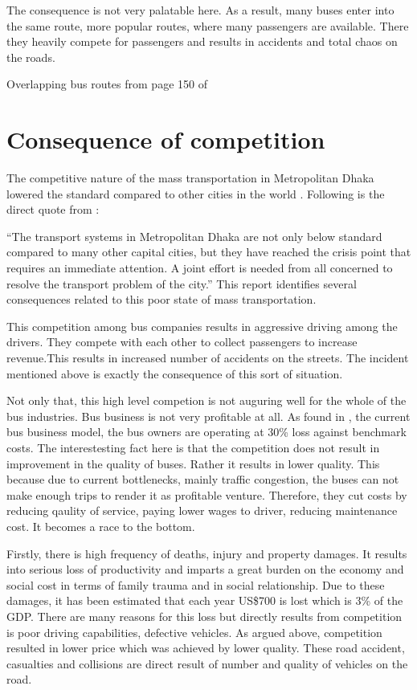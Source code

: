 \documentclass[
  11pt,
]{article}
\begin{document}
The consequence is not very palatable here. As a result, many buses
enter into the same route, more popular routes, where many passengers
are available. There they heavily compete for passengers and results in
accidents and total chaos on the roads.

Overlapping bus routes from page 150 of \textcite{dtca_rstp_2015}

\hypertarget{consequence-of-competition}{%
\section{Consequence of competition}\label{consequence-of-competition}}

The competitive nature of the mass transportation in Metropolitan Dhaka
lowered the standard compared to other cities in the world . Following
is the direct quote from \textcite{dtca_utp_2015}:

``The transport systems in Metropolitan Dhaka are not only below
standard compared to many other capital cities, but they have reached
the crisis point that requires an immediate attention. A joint effort is
needed from all concerned to resolve the transport problem of the
city.'' This report identifies several consequences related to this poor
state of mass transportation.

This competition among bus companies results in aggressive driving among
the drivers. They compete with each other to collect passengers to
increase revenue.This results in increased number of accidents on the
streets. The incident mentioned above is exactly the consequence of this
sort of situation.

Not only that, this high level competion is not auguring well for the
whole of the bus industries. Bus business is not very profitable at all.
As found in \textcite{rahman_business_2017}, the current bus business
model, the bus owners are operating at 30\% loss against benchmark
costs. The interestesting fact here is that the competition does not
result in improvement in the quality of buses. Rather it results in
lower quality. This because due to current bottlenecks, mainly traffic
congestion, the buses can not make enough trips to render it as
profitable venture. Therefore, they cut costs by reducing qaulity of
service, paying lower wages to driver, reducing maintenance cost. It
becomes a race to the bottom.

Firstly, there is high frequency of deaths, injury and property damages.
It results into serious loss of productivity and imparts a great burden
on the economy and social cost in terms of family trauma and in social
relationship. Due to these damages, it has been estimated that each year
US\$700 is lost which is 3\% of the GDP. There are many reasons for this
loss but directly results from competition is poor driving capabilities,
defective vehicles. As argued above, competition resulted in lower price
which was achieved by lower quality. These road accident, casualties and
collisions are direct result of number and quality of vehicles on the
road.
\end{document}
